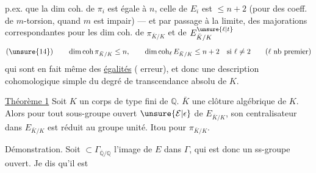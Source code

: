 p.ex. que la dim coh. de $\pi_i$ est égale à $n$, celle de $E_i$ est $\leq n+2$ (pour des coeff.  de $m$-torsion, quand $m$ est impair) --- et par passage à la limite, des majorations correspondantes pour les dim coh. de $\pi_{\bar K/K}$ et de $E_{\bar K/K}^{\unsure{\ell|t}}$
\[
(\unsure{14})\qquad \dim\operatorname{coh}\pi_{\bar K/K}\leq n,\qquad
\dim\operatorname{coh}_{\ell}E_{\bar K/K}\leq n+2\quad\text{si }\ell\neq2
\qquad(\ell\text{ nb premier})
\]
qui sont en fait même des \uline{égalités} ( erreur), et  donc une description cohomologique simple du degré de transcendance absolu de $K$.

\uline{Théorème 1} Soit $K$ un corps  de type fini de $\mathbb Q$.  $\bar K$ une clôture algébrique de $K$. Alors pour tout sous-groupe ouvert $\unsure{\mathcal E|\epsilon}$ de $E_{\bar K/K}$, son centralisateur dans $E_{\bar K/K}$ est réduit au groupe unité. Itou pour $\pi_{\bar K/K}$.

Démonstration. Soit $\subset\Gamma_{\overline{\mathbb Q}/\mathbb Q}$ l'image de $E$ dans $\Gamma$, qui est donc un ss-groupe ouvert.   Je dis qu'il est

